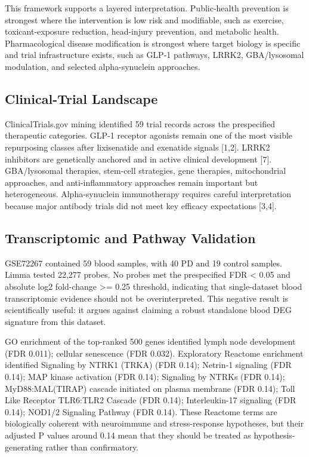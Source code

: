 \documentclass{article}
\begin{document}
This framework supports a layered interpretation. Public-health prevention is strongest where the intervention is low risk and modifiable, such as exercise, toxicant-exposure reduction, head-injury prevention, and metabolic health. Pharmacological disease modification is strongest where target biology is specific and trial infrastructure exists, such as GLP-1 pathways, LRRK2, GBA/lysosomal modulation, and selected alpha-synuclein approaches.


\subsection{Clinical-Trial Landscape}

ClinicalTrials.gov mining identified 59 trial records across the prespecified therapeutic categories. GLP-1 receptor agonists remain one of the most visible repurposing classes after lixisenatide and exenatide signals [1,2]. LRRK2 inhibitors are genetically anchored and in active clinical development [7]. GBA/lysosomal therapies, stem-cell strategies, gene therapies, mitochondrial approaches, and anti-inflammatory approaches remain important but heterogeneous. Alpha-synuclein immunotherapy requires careful interpretation because major antibody trials did not meet key efficacy expectations [3,4].


\subsection{Transcriptomic and Pathway Validation}

GSE72267 contained 59 blood samples, with 40 PD and 19 control samples. Limma tested 22,277 probes. No probes met the prespecified FDR < 0.05 and absolute log2 fold-change >= 0.25 threshold, indicating that single-dataset blood transcriptomic evidence should not be overinterpreted. This negative result is scientifically useful: it argues against claiming a robust standalone blood DEG signature from this dataset.


GO enrichment of the top-ranked 500 genes identified lymph node development (FDR 0.011); cellular senescence (FDR 0.032). Exploratory Reactome enrichment identified Signaling by NTRK1 (TRKA) (FDR 0.14); Netrin-1 signaling (FDR 0.14); MAP kinase activation (FDR 0.14); Signaling by NTRKs (FDR 0.14); MyD88:MAL(TIRAP) cascade initiated on plasma membrane (FDR 0.14); Toll Like Receptor TLR6:TLR2 Cascade (FDR 0.14); Interleukin-17 signaling (FDR 0.14); NOD1/2 Signaling Pathway (FDR 0.14). These Reactome terms are biologically coherent with neuroimmune and stress-response hypotheses, but their adjusted P values around 0.14 mean that they should be treated as hypothesis-generating rather than confirmatory.
\end{document}

